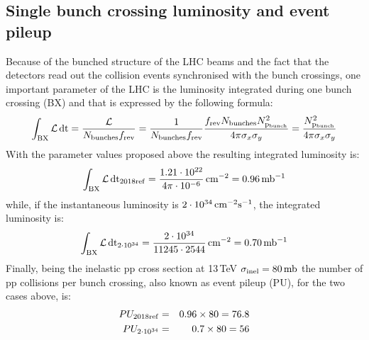 \documentclass[10pt]{article}
\begin{document}
\subsection{Single bunch crossing luminosity and event pileup}
Because of the bunched structure of the LHC beams and the fact that the detectors read out the collision events synchronised with the bunch crossings, one important parameter of the LHC is the luminosity integrated during one bunch crossing (BX) and that is expressed by the following formula:
\begin{equation}
\int_{\rm BX}{\cal L}\,{\rm dt} = \frac{{\cal L}}{N_{\rm bunches}f_{\rm rev}} = \frac{1}{N_{\rm bunches}f_{\rm rev}}\frac{f_{\rm rev}N_{\rm bunches}N_{\rm p_{bunch}}^2}{4\pi\sigma_x\sigma_y} = \frac{N_{\rm p_{bunch}}^2}{4\pi\sigma_x\sigma_y}
\end{equation}
With the parameter values proposed above the resulting integrated luminosity is:
\begin{equation}
\int_{\rm BX}{\cal L}\,{\rm dt}_{\rm 2018ref} = \frac{1.21\cdot 10^{22}}{4\pi\cdot 10^{-6}}\,{\rm cm^{-2}} = 0.96\,{\rm mb^{-1}}
\end{equation}
while, if the instantaneous luminosity is $2\cdot 10^{34}\,{\rm cm^{-2}s^{-1}}$, the integrated luminosity is:
\begin{equation}
\int_{\rm BX}{\cal L}\,{\rm dt}_{2\cdot 10^{34}} = \frac{2\cdot 10^{34}}{11245\cdot 2544}\,{\rm cm^{-2}} = 0.70\,{\rm mb^{-1}}
\end{equation}
Finally, being the inelastic pp cross section at 13\,TeV $\sigma_{\rm inel}=80\,{\rm mb}$ the number of pp collisions per bunch crossing, also known as event pileup (PU), for the two cases above, is:
\begin{eqnarray}
PU_{\rm 2018ref}&=&0.96\times 80 = 76.8\\
PU_{2\cdot 10^{34}}&=&0.7\times 80 = 56
\end{eqnarray}
\end{document}
